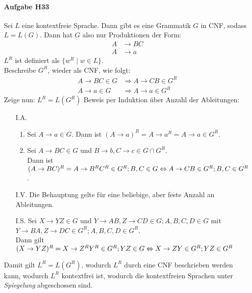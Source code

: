 \documentclass[11pt]{article}
\begin{document}

\paragraph{Aufgabe H33} Sei $L$ eine kontextfreie Sprache. Dann gibt es eine Grammatik $G$ in CNF, sodass $L=L(G)$. Dann hat $G$ also nur Produktionen der Form:
\begin{align*}
A &\rightarrow BC \\
A &\rightarrow a
\end{align*}
$L^R$ ist definiert als $\{w^R \mid w \in L\}$.
\\Beschreibe $G^R$, wieder als CNF, wie folgt:
\begin{align*}
A \rightarrow BC \in G &\Rightarrow A \rightarrow CB \in G^R \\
A \rightarrow a \in G &\Rightarrow A \rightarrow a \in G^R
\end{align*}
Zeige nun: $L^R=L(G^R)$
Beweis per Induktion über Anzahl der Ableitungen:
\begin{itemize}
\item[I.A.] 
\begin{enumerate}[label=\arabic*)]
\item Sei $A \rightarrow a \in G$. Dann ist $(A \rightarrow a)^R = A \rightarrow a^R = A \rightarrow a \in G^R$.
\item Sei $A \rightarrow BC \in G$ und $B\rightarrow b, C \rightarrow c \in G \cap G^R$.
\\Dann ist $(A \rightarrow BC)^R = A \rightarrow B^R C^R \in G^R; B,C \in G \\\Leftrightarrow A \rightarrow CB \in G^R; B,C \in G^R$.
\end{enumerate}
\item[I.V.] Die Behauptung gelte für eine beliebige, aber feste Anzahl an Ableitungen.
\item[I.S.] Sei $X \rightarrow YZ \in G$ und $Y \rightarrow AB, Z \rightarrow CD \in G; A,B,C,D \in G$ mit $Y \rightarrow BA, Z \rightarrow DC \in G^R; A,B,C,D \in G^R$.
\\Dann gilt $(X \rightarrow YZ)^R = X \rightarrow Z^R Y^R \in G^R; YZ \in G \\\Leftrightarrow X \rightarrow ZY \in G^R; YZ \in G^R$
\end{itemize}
Damit gilt $L^R=L(G^R)$, wodurch $L^R$ durch eine CNF beschrieben werden kann, wodurch $L^R$ kontextfrei ist, wodurch die kontextfreien Sprachen unter \textit{Spiegelung} abgeschossen sind.
\end{document}
